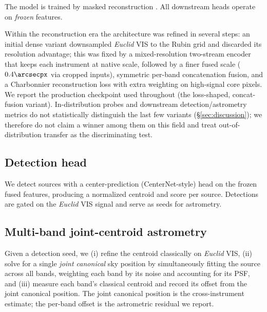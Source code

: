 The model is trained by masked reconstruction . All downstream heads operate on \emph{frozen} features.

Within the reconstruction era the architecture was refined in several steps:
an initial dense variant downsampled \textit{Euclid} VIS to the Rubin grid and
discarded its resolution advantage; this was fixed by a mixed-resolution
two-stream encoder that keeps each instrument at native scale, followed by a
finer fused scale ($0.4\arcsecpx$ via cropped inputs), symmetric per-band
concatenation fusion, and a Charbonnier reconstruction loss with extra
weighting on high-signal core pixels. We report the production checkpoint used
throughout (the loss-shaped, concat-fusion variant). In-distribution probes and
downstream detection/astrometry metrics do not statistically distinguish the
last few variants (\S\ref{sec:discussion}); we therefore do not claim a winner
among them on this field and treat out-of-distribution transfer as the
discriminating test. 

\subsection{Detection head}
\label{sec:methods:detection}

We detect sources with a center-prediction (CenterNet-style) head on the frozen
fused features, producing a normalized centroid and score per source.
 Detections are gated on the \textit{Euclid} VIS signal
and serve as seeds for astrometry.

\subsection{Multi-band joint-centroid astrometry}
\label{sec:methods:astrometry}

Given a detection seed, we (i) refine the centroid classically on
\textit{Euclid} VIS, (ii) solve for a single \emph{joint canonical} sky
position by simultaneously fitting the source across all bands, weighting each
band by its noise and accounting for its PSF, and (iii) measure each band's
classical centroid and record its offset from the joint canonical position.
The joint canonical position is the cross-instrument estimate; the per-band
offset is the astrometric residual we report.

